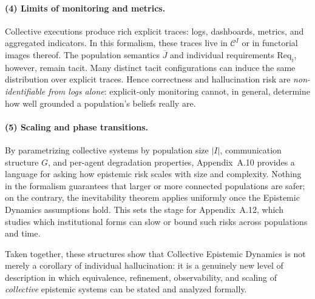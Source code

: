 \paragraph{(4) Limits of monitoring and metrics.}
Collective executions produce rich explicit traces: logs, dashboards,
metrics, and aggregated indicators. In this formalism, these traces live in
$\mathcal{C}^I$ or in functorial images thereof. The population semantics
$\overline{J}$ and individual requirements $\mathrm{Req}_i$, however, remain
tacit. Many distinct tacit configurations can induce the same distribution
over explicit traces. Hence correctness and hallucination risk are
\emph{non-identifiable from logs alone}: explicit-only monitoring cannot, in
general, determine how well grounded a population's beliefs really are.

\paragraph{(5) Scaling and phase transitions.}
By parametrizing collective systems by population size $|I|$, communication
structure $G$, and per-agent degradation properties, Appendix~A.10 provides a
language for asking how epistemic risk scales with size and complexity.
Nothing in the formalism guarantees that larger or more connected populations
are safer; on the contrary, the inevitability theorem applies uniformly once
the Epistemic Dynamics assumptions hold. This sets the stage for Appendix~A.12, which
studies which institutional forms can slow or bound such risks across
populations and time.

Taken together, these structures show that Collective Epistemic Dynamics is not merely a
corollary of individual hallucination: it is a genuinely new level of
description in which equivalence, refinement, observability, and scaling of
\emph{collective} epistemic systems can be stated and analyzed formally.
